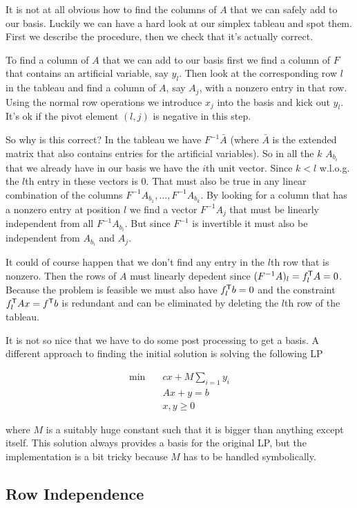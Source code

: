 It is not at all obvious how to find the columns of $A$ that we can safely add to our basis. Luckily we can have a hard look at our simplex tableau and spot them. First we describe the procedure, then we check that it's actually correct.

To find a column of $A$ that we can add to our basis first we find a column of $F$ that contains an artificial variable, say $y_l$. Then look at the corresponding row $l$ in the tableau and find a column of $A$, say $A_j$, with a nonzero entry in that row. Using the normal row operations we introduce $x_j$ into the basis and kick out $y_l$. It's ok if the pivot element $(l,j)$ is negative in this step.

So why is this correct? In the tableau we have $F^{-1}\bar A$ (where $\bar A$ is the extended matrix that also contains entries for the artificial variables). So in all the $k$ $A_{b_i}$ that we already have in our basis we have the $i$th unit vector. Since  $k<l$ w.l.o.g. the $l$th entry in these vectors is $0$. That must also be true in any linear combination of the columns $F^{-1}A_{b_1},\ldots, F^{-1}A_{b_k}$. By looking for a column that has a nonzero entry at position $l$ we find a vector $F^{-1}A_j$ that must be linearly independent from all $F^{-1}A_{b_i}$. But since $F^{-1}$ is invertible it must also be independent from $A_{b_i}$ and $A_j$.

It could of course happen that we don't find any entry in the $l$th row that is nonzero. Then the rows of $A$ must linearly depedent since $(F^{-1}A)_l={f}^\text{\upshape \sffamily T}_l A=0$. Because the problem is feasible we must also have ${f}^\text{\upshape \sffamily T}_l b = 0$ and the constraint ${f}^\text{\upshape \sffamily T}_l A x = {f}^\text{\upshape \sffamily T} b$ is redundant and can be eliminated by deleting the $l$th row of the tableau. 

It is not so nice that we have to do some post processing to get a basis. A different approach to finding the initial solution is solving the following LP

\begin{align*}
\min \quad & cx + M\sum_{i=1} y_i\\
&Ax+y=b\\
&x,y\geq 0
\end{align*}

where $M$ is a suitably huge constant such that it is bigger than anything except itself. This solution always provides a basis for the original LP, but the implementation is a bit tricky because $M$ has to be handled symbolically.

\subsection{Row Independence}

